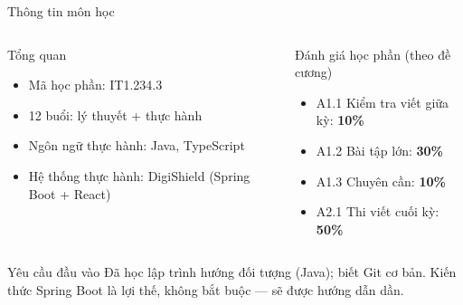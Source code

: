 \documentclass[aspectratio=169,12pt]{beamer}
\begin{document}
\begin{frame}{Thông tin môn học}
  \begin{columns}
    \begin{block}{Tổng quan}
      \begin{itemize}
        \item Mã học phần: IT1.234.3
        \item 12 buổi: lý thuyết + thực hành
        \item Ngôn ngữ thực hành: Java, TypeScript
        \item Hệ thống thực hành: DigiShield (Spring Boot + React)
      \end{itemize}
    \end{block}

    \begin{block}{Đánh giá học phần (theo đề cương)}
      \begin{itemize}
        \item A1.1 Kiểm tra viết giữa kỳ: \textbf{10\%}
        \item A1.2 Bài tập lớn: \textbf{30\%}
        \item A1.3 Chuyên cần: \textbf{10\%}
        \item A2.1 Thi viết cuối kỳ: \textbf{50\%}
      \end{itemize}
    \end{block}
  \end{columns}

  \vspace{0.4em}
  \begin{alertblock}{Yêu cầu đầu vào}
    Đã học lập trình hướng đối tượng (Java); biết Git cơ bản.
    Kiến thức Spring Boot là lợi thế, không bắt buộc --- sẽ được hướng dẫn dần.
  \end{alertblock}
\end{frame}
\end{document}
